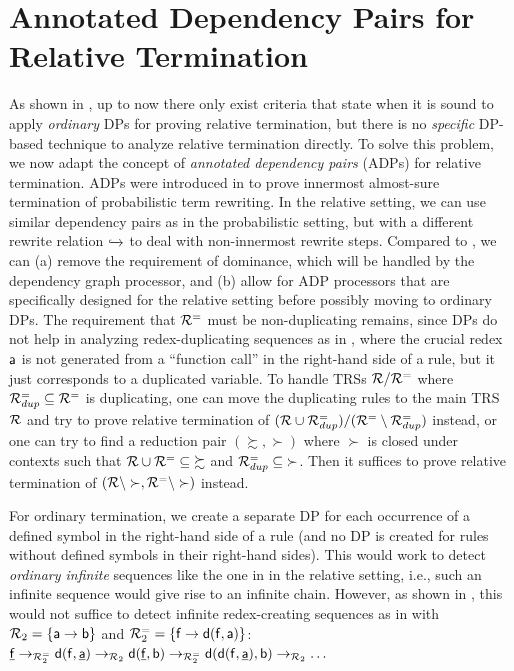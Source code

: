 \section{Annotated Dependency Pairs for Relative Termination}\label{Relative DP Framework}



As shown in ,
up to now there only exist criteria \cite{iborra2017relative} that state
when it is sound to apply
\emph{ordinary} DPs for proving relative termination, but there is no \emph{specific} DP-based technique
to analyze relative termination directly. To solve this problem, we now
adapt the concept of \emph{annotated dependency pairs} (ADPs) for relative termination.
ADPs were introduced in \cite{FLOPS2024} to prove innermost almost-sure termination of probabilistic term rewriting.
In the relative setting, we can use similar dependency pairs as in the probabilistic setting,
but with a different rewrite relation $\mathrel{ \xhookrightarrow{{}_{\scriptstyle }} \!\!{}^{}_{} }$ to deal with non-innermost rewrite steps.
Compared to \cite{iborra2017relative},
we can (a) remove the requirement of dominance, which will be handled
by the dependency graph processor, and (b) allow for ADP processors that are specifically designed for the relative
setting before possibly moving to ordinary DPs.
The requirement that 
$\mathcal{R}^{=}$ must be non-duplicating remains, since DPs do not help in analyzing
redex-duplicating sequences as in , where the crucial redex
$\mathsf{a}$ is not generated from a ``function call'' \pagebreak[2]
in the right-hand side of a rule,
but it just corresponds to a duplicated variable.
To handle TRSs $\mathcal{R} / \mathcal{R}^{=}$ where $\mathcal{R}^{=}_{dup} \subseteq\mathcal{R}^{=}$
is duplicating,
one can move the duplicating rules to the main TRS $\mathcal{R}$ and 
try to prove relative termination of
$(\mathcal{R} \cup \mathcal{R}^{=}_{dup})/(\mathcal{R}^{=} \setminus \mathcal{R}^{=}_{dup})$ instead,
or one can try to find a reduction pair $(\succsim, \succ)$ where
$\succ$ is closed under contexts such that $\mathcal{R} \cup \mathcal{R}^= \subseteq {\succsim}$ and
$\mathcal{R}^{=}_{dup} \subseteq {\succ}$. Then it suffices to prove relative termination of $(\mathcal{R}
\setminus \succ, \mathcal{R}^{=} \setminus \succ)$ instead.



For ordinary termination, we create a separate DP for each occurrence of a
defined symbol in the right-hand side of a rule (and no DP is created for rules without
defined symbols in their right-hand sides).
This would work to detect
\emph{ordinary infinite} sequences
like the one in 
in the relative setting, i.e., such an infinite sequence would give rise to an infinite chain. 
However,  as shown in , this
would not suffice to detect infinite redex-creating sequences as in
with   $\mathcal{R}_2 = \{\mathsf{a} \to \mathsf{b}\}$ and $\mathcal{R}_2^{=} = \{\mathsf{f} \to \mathsf{d}(\mathsf{f},\mathsf{a})\}$:
$\underline{\mathsf{f}}
    \to_{\mathcal{R}_2^{=}} \mathsf{d}(\mathsf{f},\underline{\mathsf{a}}) \to_{\mathcal{R}_2} \mathsf{d}(\underline{\mathsf{f}},\mathsf{b}) \to_{\mathcal{R}_2^{=}}
    \mathsf{d}(\mathsf{d}(\mathsf{f},\underline{\mathsf{a}}),\mathsf{b}) \to_{\mathcal{R}_2}
     \ldots$\

